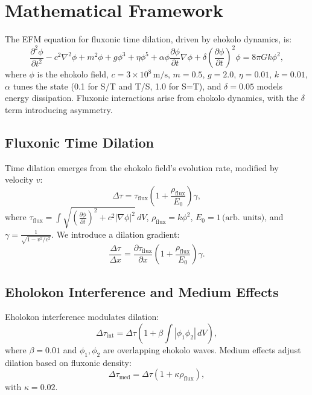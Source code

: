 \documentclass[11pt]{article}
\begin{document}
\section{Mathematical Framework}
The EFM equation for fluxonic time dilation, driven by ehokolo dynamics, is:
\begin{equation}
\frac{\partial^2 \phi}{\partial t^2} - c^2 \nabla^2 \phi + m^2 \phi + g \phi^3 + \eta \phi^5 + \alpha \phi \frac{\partial \phi}{\partial t} \nabla \phi + \delta \left(\frac{\partial \phi}{\partial t}\right)^2 \phi = 8 \pi G k \phi^2,
\end{equation}
where \(\phi\) is the ehokolo field, \(c = 3 \times 10^8 \, \text{m/s}\), \(m = 0.5\), \(g = 2.0\), \(\eta = 0.01\), \(k = 0.01\), \(\alpha\) tunes the state (0.1 for S/T and T/S, 1.0 for S=T), and \(\delta = 0.05\) models energy dissipation. Fluxonic interactions arise from ehokolo dynamics, with the \(\delta\) term introducing asymmetry.

\subsection{Fluxonic Time Dilation}
Time dilation emerges from the ehokolo field’s evolution rate, modified by velocity \(v\):
\begin{equation}
\Delta \tau = \tau_{\text{flux}} \left(1 + \frac{\rho_{\text{flux}}}{E_0}\right) \gamma,
\end{equation}
where \(\tau_{\text{flux}} = \int \sqrt{\left(\frac{\partial \phi}{\partial t}\right)^2 + c^2 |\nabla \phi|^2} \, dV\), \(\rho_{\text{flux}} = k \phi^2\), \(E_0 = 1 \, \text{(arb. units)}\), and \(\gamma = \frac{1}{\sqrt{1 - v^2/c^2}}\). We introduce a dilation gradient:
\begin{equation}
\frac{\Delta \tau}{\Delta x} = \frac{\partial \tau_{\text{flux}}}{\partial x} \left(1 + \frac{\rho_{\text{flux}}}{E_0}\right) \gamma.
\end{equation}

\subsection{Eholokon Interference and Medium Effects}
Eholokon interference modulates dilation:
\begin{equation}
\Delta \tau_{\text{int}} = \Delta \tau \left(1 + \beta \int |\phi_1 \phi_2| \, dV\right),
\end{equation}
where \(\beta = 0.01\) and \(\phi_1, \phi_2\) are overlapping ehokolo waves. Medium effects adjust dilation based on fluxonic density:
\begin{equation}
\Delta \tau_{\text{med}} = \Delta \tau \left(1 + \kappa \rho_{\text{flux}}\right),
\end{equation}
with \(\kappa = 0.02\).
\end{document}
